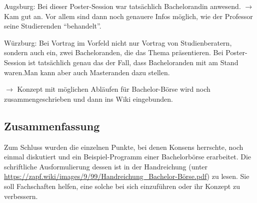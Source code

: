     Augsburg: Bei dieser Poster-Session war tatsächlich Bachelorandin anwesend. $\rightarrow$ Kam gut an. Vor allem sind dann noch genauere Infos möglich, wie der Professor seine Studierenden ``behandelt''.

    Würzburg: Bei Vortrag im Vorfeld nicht nur Vortrag von Studienberatern, sondern auch ein, zwei Bacheloranden, die das Thema präsentieren. Bei Poster-Session ist tatsächlich genau das der Fall, dass Bacheloranden mit am Stand waren.Man kann aber auch Masteranden dazu stellen.

    $\rightarrow$ Konzept mit möglichen Abläufen für Bachelor-Börse wird noch zusammengeschrieben und dann ins Wiki eingebunden.

    \subsection{Zusammenfassung}
      Zum Schluss wurden die einzelnen Punkte, bei denen Konsens herrschte, noch einmal diskutiert und ein Beispiel-Programm einer Bachelorbörse erarbeitet. Die schriftliche Ausformulierung dessen ist in der Handreichung (unter \url{https://zapf.wiki/images/9/99/Handreichung_Bachelor-Börse.pdf}) zu lesen. Sie soll Fachschaften helfen, eine solche bei sich einzuführen oder ihr Konzept zu verbessern.

